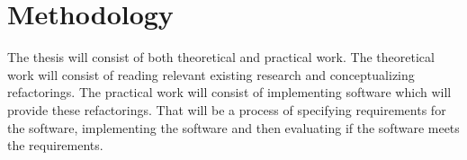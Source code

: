 \documentclass[11pt]{article}
\begin{document}
\section*{Methodology}

The thesis will consist of both theoretical and practical work. The theoretical work will
consist of reading relevant existing research and conceptualizing refactorings. The
practical work will consist of implementing software which will provide these
refactorings. That will be a process of specifying requirements for the software,
implementing the software and then evaluating if the software meets the requirements.

\printbibliography
\end{document}
